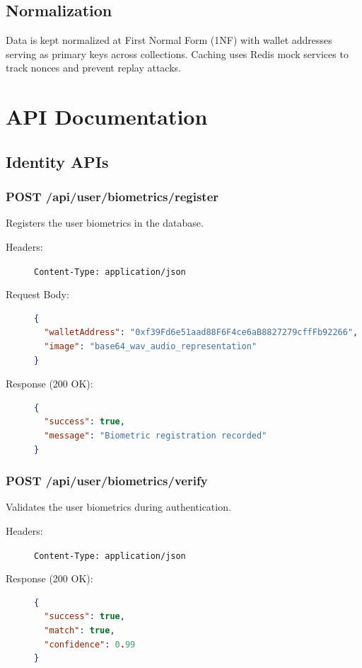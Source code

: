 \documentclass[12pt,a4paper,oneside]{report}
\begin{document}
\section{Normalization}
Data is kept normalized at First Normal Form (1NF) with wallet addresses serving as primary keys across collections. Caching uses Redis mock services to track nonces and prevent replay attacks.

\newpage

\chapter{API Documentation}

\section{Identity APIs}

\subsection{POST /api/user/biometrics/register}
Registers the user biometrics in the database.
\begin{description}
    \item[Headers:] \texttt{Content-Type: application/json}
    \item[Request Body:]
\begin{lstlisting}[language=json]
{
  "walletAddress": "0xf39Fd6e51aad88F6F4ce6aB8827279cffFb92266",
  "image": "base64_wav_audio_representation"
}
\end{lstlisting}
    \item[Response (200 OK):]
\begin{lstlisting}[language=json]
{
  "success": true,
  "message": "Biometric registration recorded"
}
\end{lstlisting}
\end{description}

\subsection{POST /api/user/biometrics/verify}
Validates the user biometrics during authentication.
\begin{description}
    \item[Headers:] \texttt{Content-Type: application/json}
    \item[Response (200 OK):]
\begin{lstlisting}[language=json]
{
  "success": true,
  "match": true,
  "confidence": 0.99
}
\end{lstlisting}
\end{description}
\end{document}
